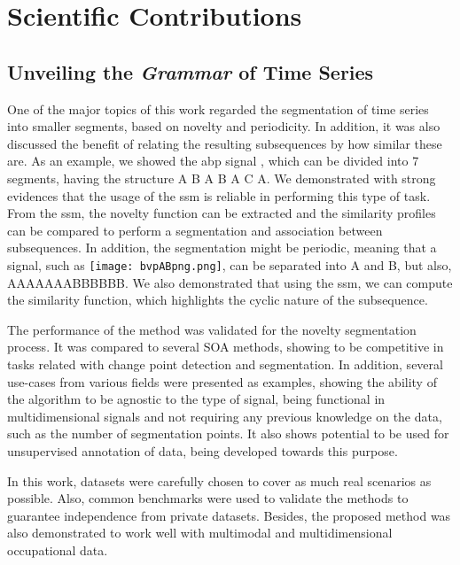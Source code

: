 \section{Scientific Contributions}

\subsection{Unveiling the \textit{Grammar} of Time Series}

One of the major topics of this work regarded the segmentation of time series into smaller segments, based on novelty and periodicity. In addition, it was also discussed the benefit of relating the resulting subsequences by how similar these are. As an example, we showed the \gls{abp} signal , which can be divided into 7 segments, having the structure \textcolor{mygreen3}{A} \textcolor{mymagenta}{B} \textcolor{mygreen3}{A} \textcolor{mymagenta}{B} \textcolor{mygreen3}{A} \textcolor{myblue5}{C} \textcolor{mygreen3}{A}. We demonstrated with strong evidences that the usage of the \gls{ssm} is reliable in performing this type of task. From the \gls{ssm}, the novelty function can be extracted and the similarity profiles can be compared to perform a segmentation and association between subsequences. In addition, the segmentation might be periodic, meaning that a signal, such as \texttt{[image: bvpABpng.png]}, can be separated into \textcolor{myblue}{A} and \textcolor{mygreen}{B}, but also, \textcolor{myblue}{AAAAAAA}\textcolor{mygreen}{BBBBBB}. We also demonstrated that using the \gls{ssm}, we can compute the similarity function, which highlights the cyclic nature of the subsequence.
\par
The performance of the method was validated for the novelty segmentation  process. It was compared to several SOA methods, showing to be competitive in tasks related with change point detection and segmentation. In addition, several use-cases from various fields were presented as examples, showing the ability of the algorithm to be agnostic to the type of signal, being functional in multidimensional signals and not requiring any previous knowledge on the data, such as the number of segmentation points. It also shows potential to be used for unsupervised annotation of data, being developed towards this purpose.
\par
In this work, datasets were carefully chosen to cover as much real scenarios as possible. Also, common benchmarks were used to validate the methods to guarantee independence from private datasets. Besides, the proposed method was also demonstrated to work well with multimodal and multidimensional occupational data.

